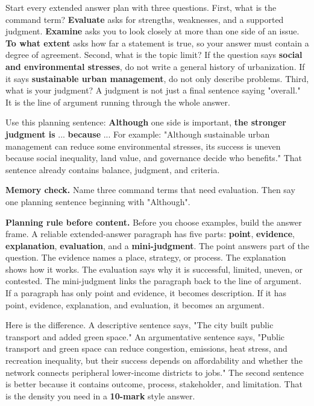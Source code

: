 \documentclass[11pt,a4paper]{article}
\newcommand{\term}[1]{\textcolor{HeadingBlue}{\textbf{#1}}}
\newcommand{\exam}[1]{\textcolor{AccentTeal}{\textbf{#1}}}
\begin{document}
Start every extended answer plan with three questions. First, what is the
command term? \exam{Evaluate} asks for strengths, weaknesses, and a supported
judgment. \exam{Examine} asks you to look closely at more than one side of an
issue. \exam{To what extent} asks how far a statement is true, so your answer
must contain a degree of agreement. Second, what is the topic limit? If the
question says \term{social and environmental stresses}, do not write a general
history of urbanization. If it says \term{sustainable urban management}, do not
only describe problems. Third, what is your judgment? A judgment is not just a
final sentence saying "overall." It is the line of argument running through the
whole answer.

Use this planning sentence: \term{Although} one side is important, \term{the
stronger judgment is} ... \term{because} ... For example: "Although sustainable
urban management can reduce some environmental stresses, its success is uneven
because social inequality, land value, and governance decide who benefits."
That sentence already contains balance, judgment, and criteria.

\textbf{Memory check.} Name three command terms that need evaluation. Then say
one planning sentence beginning with "Although".

\textbf{Planning rule before content.}
Before you choose examples, build the answer frame. A reliable extended-answer
paragraph has five parts: \term{point}, \term{evidence}, \term{explanation},
\term{evaluation}, and a \term{mini-judgment}. The point answers part of the
question. The evidence names a place, strategy, or process. The explanation
shows how it works. The evaluation says why it is successful, limited, uneven,
or contested. The mini-judgment links the paragraph back to the line of
argument. If a paragraph has only point and evidence, it becomes description. If
it has point, evidence, explanation, and evaluation, it becomes an argument.

Here is the difference. A descriptive sentence says, "The city built public
transport and added green space." An argumentative sentence says, "Public
transport and green space can reduce congestion, emissions, heat stress, and
recreation inequality, but their success depends on affordability and whether
the network connects peripheral lower-income districts to jobs." The second
sentence is better because it contains outcome, process, stakeholder, and
limitation. That is the density you need in a \term{10-mark} style answer.
\end{document}
